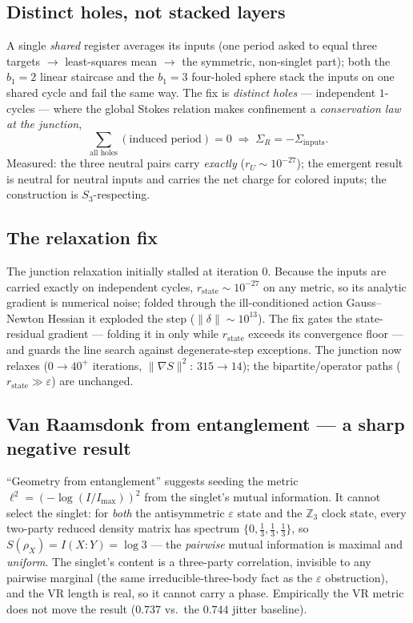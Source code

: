 \documentclass[11pt]{article}
\newcommand{\Z}{\mathbb{Z}}
\newcommand{\Sg}{\Sigma}
\newcommand{\lsq}{\ell^2}
\begin{document}
\subsection{Distinct holes, not stacked layers}

A single \emph{shared} register averages its inputs (one period asked to equal
three targets $\to$ least-squares mean $\to$ the symmetric, non-singlet part); both
the $b_1=2$ linear staircase and the $b_1=3$ four-holed sphere stack the inputs on
one shared cycle and fail the same way. The fix is \emph{distinct holes} ---
independent $1$-cycles --- where the global Stokes relation makes confinement a
\emph{conservation law at the junction},
\[
  \sum_{\text{all holes}}(\text{induced period})=0
  \;\Longrightarrow\;
  \Sg_R=-\Sg_{\text{inputs}} .
\]
Measured: the three neutral pairs carry \emph{exactly} ($r_U\sim 10^{-27}$); the
emergent result is neutral for neutral inputs and carries the net charge for
colored inputs; the construction is $S_3$-respecting.

\subsection{The relaxation fix}

The junction relaxation initially stalled at iteration $0$. Because the inputs are
carried exactly on independent cycles, $r_{\text{state}}\sim 10^{-27}$ on any
metric, so its analytic gradient is numerical noise; folded through the
ill-conditioned action Gauss--Newton Hessian it exploded the step
($\lVert\delta\rVert\sim 10^{13}$). The fix gates the state-residual gradient ---
folding it in only while $r_{\text{state}}$ exceeds its convergence floor --- and
guards the line search against degenerate-step exceptions. The junction now relaxes
($0\to 40^+$ iterations, $\lVert\nabla S\rVert^2:\,315\to 14$); the
bipartite/operator paths ($r_{\text{state}}\gg\varepsilon$) are unchanged.

\subsection{Van Raamsdonk from entanglement --- a sharp negative result}

``Geometry from entanglement'' suggests seeding the metric
$\lsq=(-\log(I/I_{\max}))^2$ from the singlet's mutual information. It cannot select
the singlet: for \emph{both} the antisymmetric $\varepsilon$ state and the $\Z_3$
clock state, every two-party reduced density matrix has spectrum
$\{0,\tfrac13,\tfrac13,\tfrac13\}$, so $S(\rho_X)=I(X{:}Y)=\log 3$ --- the
\emph{pairwise} mutual information is maximal and \emph{uniform}. The singlet's
content is a three-party correlation, invisible to any pairwise marginal (the same
irreducible-three-body fact as the $\varepsilon$ obstruction), and the VR length is
real, so it cannot carry a phase. Empirically the VR metric does not move the
result ($0.737$ vs.\ the $0.744$ jitter baseline).
\end{document}
